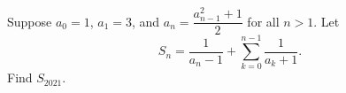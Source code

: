 Suppose $a_0=1$, $a_1=3$, and $a_n=\dfrac{a_{n-1}^2+1}{2}$ for all $n>1$. Let
\[S_n=\dfrac1{a_n-1}+\sum_{k=0}^{n-1}\dfrac1{a_k+1}.\]
Find $S_{2021}$.
